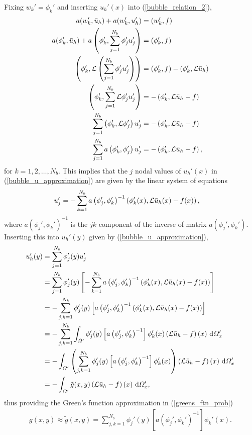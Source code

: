 Fixing $w_k' = \phi_k'$ and inserting $u_h'(x)$ into (\ref{bubble_relation_2}),
\begin{align*}
  a(w_k', \bar{u}_h) + a(w_k',u_h')  &= (w_k',f) \\
  a(\phi_k', \bar{u}_h) + a\left( \phi_k', \sum_{j=1}^{N_b} \phi_j' u_j' \right)  &= (\phi_k',f) \\
  \left( \phi_k', \mathcal{L} \left( \sum_{j=1}^{N_b} \phi_j' u_j' \right) \right)  &= (\phi_k',f) - (\phi_k', \mathcal{L} \bar{u}_h) \\
  \left( \phi_k', \sum_{j=1}^{N_b} \mathcal{L} \phi_j' u_j' \right)  &= - \left( \phi_k', \mathcal{L} \bar{u}_h - f \right) \\
  \sum_{j=1}^{N_b} \left( \phi_k', \mathcal{L} \phi_j' \right) u_j'  &= - \left( \phi_k', \mathcal{L} \bar{u}_h - f \right) \\
  \sum_{j=1}^{N_b} a\left( \phi_k', \phi_j' \right) u_j'  &= - \left( \phi_k', \mathcal{L} \bar{u}_h - f \right),
\end{align*}
for $k = 1,2,\ldots,N_b$.  This implies that the $j$ nodal values of $u_h'(x)$ in (\ref{bubble_u_approximation}) are given by the linear system of equations
\begin{align*}
  u_j' &= - \sum_{k=1}^{N_b} a\left( \phi_j', \phi_k' \right)^{-1} \left( \phi_k'(x), \mathcal{L} \bar{u}_h(x) - f(x) \right),
\end{align*}
where $a\left( \phi_j', \phi_k' \right)^{-1}$ is the $jk$ component of the inverse of matrix $a\left( \phi_j', \phi_k' \right)$.  Inserting this into $u_h'(y)$ given by (\ref{bubble_u_approximation}),
{\footnotesize
\begin{align*}
  u_h'(y) &= \sum_{j=1}^{N_b} \phi_j'(y) u_j' \\
  &= \sum_{j=1}^{N_b} \phi_j'(y) \left[ - \sum_{k=1}^{N_b} a\left( \phi_j', \phi_k' \right)^{-1} \left( \phi_k'(x), \mathcal{L} \bar{u}_h(x) - f(x) \right) \right] \\
  &= -\sum_{j,k=1}^{N_b} \phi_j'(y) \left[ a\left( \phi_j', \phi_k' \right)^{-1} \left( \phi_k'(x), \mathcal{L} \bar{u}_h(x) - f(x) \right) \right] \\
  &= - \sum_{j,k=1}^{N_b} \int_{\varOmega'} \phi_j'(y) \left[ a\left( \phi_j', \phi_k' \right)^{-1} \right] \phi_k'(x) \left(\mathcal{L} \bar{u}_h - f \right)(x) \ \mathrm{d}\varOmega_x' \\
  &= - \int_{\varOmega'} \left( \sum_{j,k=1}^{N_b} \phi_j'(y) \left[ a\left( \phi_j', \phi_k' \right)^{-1} \right] \phi_k'(x) \right) \left(\mathcal{L} \bar{u}_h - f \right)(x) \ \mathrm{d}\varOmega_x' \\
  &= - \int_{\varOmega'} \tilde{g}(x,y) \left(\mathcal{L} \bar{u}_h - f \right)(x) \ \mathrm{d}\varOmega_x',
\end{align*}}
thus providing the Green's function approximation in (\ref{greens_ftn_prob})
\begin{align}
  \label{greens_ftn_approx}
  g(x,y) \approx \tilde{g}(x,y) = \sum_{j,k=1}^{N_b} \phi_j'(y) \left[ a\left( \phi_j', \phi_k' \right)^{-1} \right] \phi_k'(x).
\end{align}

